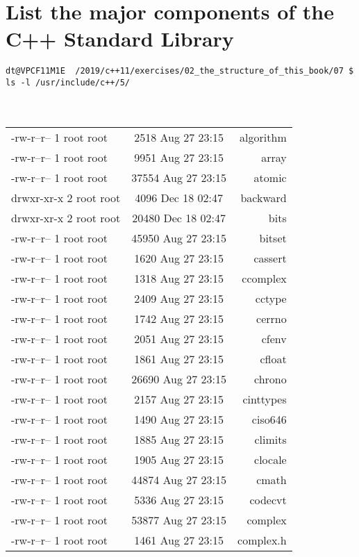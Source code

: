\documentclass[10pt]{article}
\begin{document}
 \section*{List the major components of the C++ Standard Library} 
 \texttt{dt@VPCF11M1E ~/2019/c++11/exercises/02\_the\_structure\_of\_this\_book/07 \$ ls -l /usr/include/c++/5/\\}
 \\
 \\
   \begin{tabular}{|l|c|r|}
    -rw-r--r-- 1 root root &  2518 Aug 27 23:15 & algorithm\\
    -rw-r--r-- 1 root root &  9951 Aug 27 23:15 & array\\
    -rw-r--r-- 1 root root & 37554 Aug 27 23:15 & atomic\\
    drwxr-xr-x 2 root root &  4096 Dec 18 02:47 & backward\\
    drwxr-xr-x 2 root root & 20480 Dec 18 02:47 & bits\\
    -rw-r--r-- 1 root root & 45950 Aug 27 23:15 & bitset\\
    -rw-r--r-- 1 root root &  1620 Aug 27 23:15 & cassert\\
    -rw-r--r-- 1 root root &  1318 Aug 27 23:15 & ccomplex\\
    -rw-r--r-- 1 root root &  2409 Aug 27 23:15 & cctype\\
    -rw-r--r-- 1 root root &  1742 Aug 27 23:15 & cerrno\\
    -rw-r--r-- 1 root root &  2051 Aug 27 23:15 & cfenv\\
    -rw-r--r-- 1 root root &  1861 Aug 27 23:15 & cfloat\\
    -rw-r--r-- 1 root root & 26690 Aug 27 23:15 & chrono\\
    -rw-r--r-- 1 root root &  2157 Aug 27 23:15 & cinttypes\\
    -rw-r--r-- 1 root root &  1490 Aug 27 23:15 & ciso646\\
    -rw-r--r-- 1 root root &  1885 Aug 27 23:15 & climits\\
    -rw-r--r-- 1 root root &  1905 Aug 27 23:15 & clocale\\
    -rw-r--r-- 1 root root & 44874 Aug 27 23:15 & cmath\\
    -rw-r--r-- 1 root root &  5336 Aug 27 23:15 & codecvt\\
    -rw-r--r-- 1 root root & 53877 Aug 27 23:15 & complex\\
    -rw-r--r-- 1 root root &  1461 Aug 27 23:15 & complex.h\\

\end{tabular}
\end{document}
